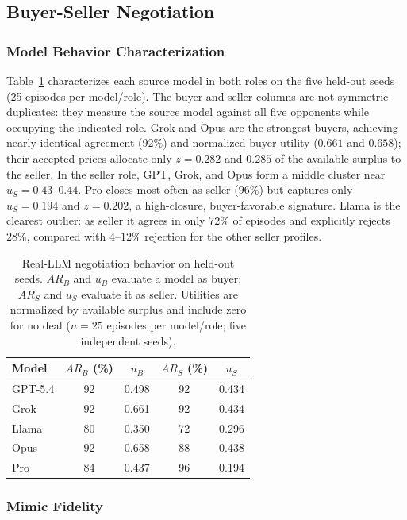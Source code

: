 \documentclass[conference]{IEEEtran}
\begin{document}
\subsection{Buyer-Seller Negotiation}

\subsubsection{Model Behavior Characterization}

Table~\ref{tab:neg_behavior} characterizes each source model in both roles on the five held-out seeds (25 episodes per model/role). The buyer and seller columns are not symmetric duplicates: they measure the source model against all five opponents while occupying the indicated role. Grok and Opus are the strongest buyers, achieving nearly identical agreement ($92\%$) and normalized buyer utility ($0.661$ and $0.658$); their accepted prices allocate only $z=0.282$ and $0.285$ of the available surplus to the seller. In the seller role, GPT, Grok, and Opus form a middle cluster near $u_S=0.43$--$0.44$. Pro closes most often as seller ($96\%$) but captures only $u_S=0.194$ and $z=0.202$, a high-closure, buyer-favorable signature. Llama is the clearest outlier: as seller it agrees in only $72\%$ of episodes and explicitly rejects $28\%$, compared with $4$--$12\%$ rejection for the other seller profiles.

\begin{table}[htbp]
\caption{Real-LLM negotiation behavior on held-out seeds. $AR_B$ and $u_B$ evaluate a model as buyer; $AR_S$ and $u_S$ evaluate it as seller. Utilities are normalized by available surplus and include zero for no deal ($n=25$ episodes per model/role; five independent seeds).}
\label{tab:neg_behavior}
\centering
\begin{tabular}{lcccc}
\hline
Model & $AR_B$ (\%) & $u_B$ & $AR_S$ (\%) & $u_S$ \\
\hline
GPT-5.4 & 92 & 0.498 & 92 & 0.434 \\
Grok    & 92 & 0.661 & 92 & 0.434 \\
Llama   & 80 & 0.350 & 72 & 0.296 \\
Opus    & 92 & 0.658 & 88 & 0.438 \\
Pro     & 84 & 0.437 & 96 & 0.194 \\
\hline
\end{tabular}
\end{table}

\subsubsection{Mimic Fidelity}
\label{sec:neg-fidelity}
\end{document}
